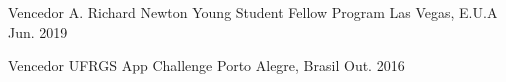 

\begin{cvhonors}
    \cvhonor
    {Vencedor} %
    {A. Richard Newton Young Student Fellow Program} %
    {Las Vegas, E.U.A} %
    {Jun. 2019} %

    \cvhonor
    {Vencedor} %
    {UFRGS App Challenge} %
    {Porto Alegre, Brasil} %
    {Out. 2016} %

\end{cvhonors}

